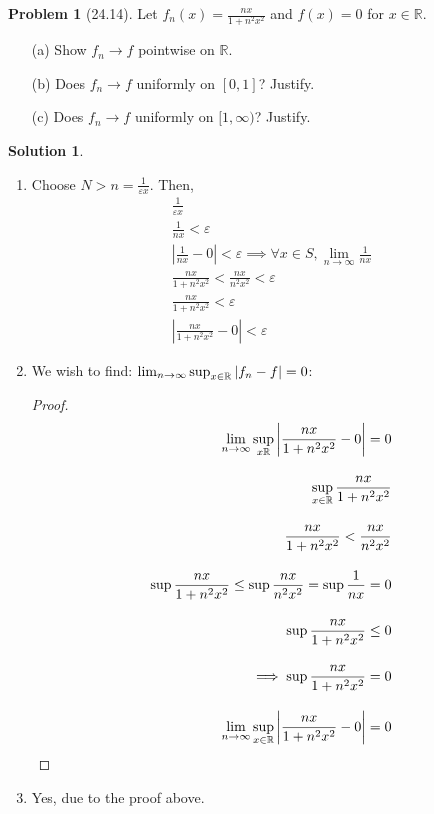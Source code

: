 \documentclass[12pt]{article}
\theoremstyle{definition} %
\newtheorem{solution}{Solution}
\newtheorem{problem}{Problem}
\theoremstyle{plain} %
\begin{document}
\begin{problem}[24.14]
    Let $ f_n(x) = \frac{nx}{1 + n^2 x^2} $ and $ f(x) = 0 $ for $ x \in \mathbb{R} $.

\begin{enumerate}
    \item[(a)] Show $ f_n \to f $ pointwise on $ \mathbb{R} $.
    \item[(b)] Does $ f_n \to f $ uniformly on $ [0, 1] $? Justify.
    \item[(c)] Does $ f_n \to f $ uniformly on $ [1, \infty) $? Justify.
\end{enumerate}
\end{problem}
\begin{solution}
    \begin{enumerate}
        \item Choose $N>n=\frac{1}{\varepsilon x}$. Then,
        \begin{align}
           \frac{1}{\varepsilon x} \\[10pt] 
           \frac{1}{nx}<\varepsilon \\[10pt] 
           \left\vert \frac{1}{nx}-0 \right\vert < \varepsilon \implies \forall x\in S, \lim_{n \to \infty} \frac{1}{nx}\\[10pt] 
           \frac{nx}{1+n^{2}x^{2}}<\frac{nx}{n^{2}x^{2}}<\varepsilon \\[10pt] 
           \frac{nx}{1+n^{2}x^{2}}<\varepsilon \\[10pt] 
           \left\vert \frac{nx}{1+n^{2}x^{2}}-0 \right\vert < \varepsilon
        \end{align}
        \item We wish to find: $\lim_{n \to \infty} \sup_{x\in\mathbb{\MakeUppercase{R}}}\left\vert f_{n}-f \right\vert =0$:
        \begin{proof}
            \begin{align}
                \lim_{n \to \infty} \sup_{x\mathbb{\MakeUppercase{r}}}\left\vert \frac{nx}{1+n^{2}x^{2}}-0 \right\vert =0 \\[10pt] 
                \sup_{x\in \mathbb{\MakeUppercase{r}}}\frac{nx}{1+n^{2}x^{2}} \\[10pt] 
                \frac{nx}{1+n^{2}x^{2}}<\frac{nx}{n^{2}x^{2}} \\[10pt] 
                \sup \frac{nx}{1+n^{2}x^{2}}\leq \sup \frac{nx}{n^{2}x^{2}} = \sup \frac{1}{nx}=0\\[10pt] 
                \sup \frac{nx}{1+n^{2}x^{2}} \leq 0 \\[10pt] 
                \implies \sup \frac{nx}{1+n^{2}x^{2}}=0 \\[10pt] 
                \lim_{n \to \infty} \sup_{x\in \mathbb{\MakeUppercase{r}} } \left\vert \frac{nx}{1+n^{2}x^{2}}-0 \right\vert =0
            \end{align} 
        \end{proof}
    \item Yes, due to the proof above.
    \end{enumerate}
\end{solution}
\end{document}
